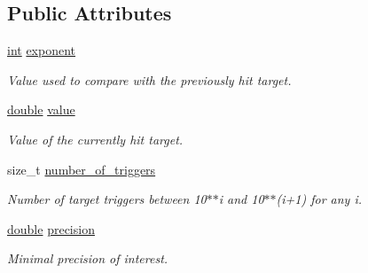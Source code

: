 \subsection*{Public Attributes}
\begin{DoxyCompactItemize}
\item 
\hyperlink{classint}{int} \hyperlink{structcoco__observer__targets__t_aea1e41b609df4f116b2911f220d59438}{exponent}\hypertarget{structcoco__observer__targets__t_aea1e41b609df4f116b2911f220d59438}{}\label{structcoco__observer__targets__t_aea1e41b609df4f116b2911f220d59438}

\begin{DoxyCompactList}\small\item\em Value used to compare with the previously hit target. \end{DoxyCompactList}\item 
\hyperlink{classdouble}{double} \hyperlink{structcoco__observer__targets__t_a60066d5bd28d41b286b7174d3a6c6acc}{value}\hypertarget{structcoco__observer__targets__t_a60066d5bd28d41b286b7174d3a6c6acc}{}\label{structcoco__observer__targets__t_a60066d5bd28d41b286b7174d3a6c6acc}

\begin{DoxyCompactList}\small\item\em Value of the currently hit target. \end{DoxyCompactList}\item 
size\+\_\+t \hyperlink{structcoco__observer__targets__t_a3dc06bff5853917f61373cfb87ba7178}{number\+\_\+of\+\_\+triggers}\hypertarget{structcoco__observer__targets__t_a3dc06bff5853917f61373cfb87ba7178}{}\label{structcoco__observer__targets__t_a3dc06bff5853917f61373cfb87ba7178}

\begin{DoxyCompactList}\small\item\em Number of target triggers between 10$\ast$$\ast$i and 10$\ast$$\ast$(i+1) for any i. \end{DoxyCompactList}\item 
\hyperlink{classdouble}{double} \hyperlink{structcoco__observer__targets__t_ad8ba9f972cc8b06e78996e4ed1d1214c}{precision}\hypertarget{structcoco__observer__targets__t_ad8ba9f972cc8b06e78996e4ed1d1214c}{}\label{structcoco__observer__targets__t_ad8ba9f972cc8b06e78996e4ed1d1214c}

\begin{DoxyCompactList}\small\item\em Minimal precision of interest. \end{DoxyCompactList}\end{DoxyCompactItemize}


